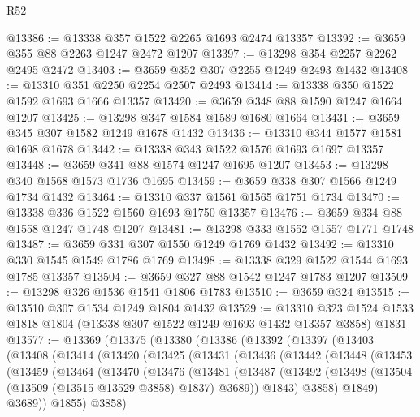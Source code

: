 \begin{lexlean}{R52}
\begin{coremodule}
@13386 := @13338 @357 @1522 @2265 @1693 @2474 @13357
@13392 := @3659 @355 @88 @2263 @1247 @2472 @1207
@13397 := @13298 @354 @2257 @2262 @2495 @2472
@13403 := @3659 @352 @307 @2255 @1249 @2493 @1432
@13408 := @13310 @351 @2250 @2254 @2507 @2493
@13414 := @13338 @350 @1522 @1592 @1693 @1666 @13357
@13420 := @3659 @348 @88 @1590 @1247 @1664 @1207
@13425 := @13298 @347 @1584 @1589 @1680 @1664
@13431 := @3659 @345 @307 @1582 @1249 @1678 @1432
@13436 := @13310 @344 @1577 @1581 @1698 @1678
@13442 := @13338 @343 @1522 @1576 @1693 @1697 @13357
@13448 := @3659 @341 @88 @1574 @1247 @1695 @1207
@13453 := @13298 @340 @1568 @1573 @1736 @1695
@13459 := @3659 @338 @307 @1566 @1249 @1734 @1432
@13464 := @13310 @337 @1561 @1565 @1751 @1734
@13470 := @13338 @336 @1522 @1560 @1693 @1750 @13357
@13476 := @3659 @334 @88 @1558 @1247 @1748 @1207
@13481 := @13298 @333 @1552 @1557 @1771 @1748
@13487 := @3659 @331 @307 @1550 @1249 @1769 @1432
@13492 := @13310 @330 @1545 @1549 @1786 @1769
@13498 := @13338 @329 @1522 @1544 @1693 @1785 @13357
@13504 := @3659 @327 @88 @1542 @1247 @1783 @1207
@13509 := @13298 @326 @1536 @1541 @1806 @1783
@13510 := @3659 @324
@13515 := @13510 @307 @1534 @1249 @1804 @1432
@13529 := @13310
    @323
    @1524
    @1533
    @1818
    @1804
    (@13338 @307 @1522 @1249 @1693 @1432 @13357 @3858)
    @1831
@13577 := @13369
    (@13375
      (@13380
        (@13386
          (@13392
            (@13397
              (@13403
                (@13408
                  (@13414
                    (@13420
                      (@13425
                        (@13431
                          (@13436
                            (@13442
                              (@13448
                                (@13453
                                  (@13459
                                    (@13464
                                      (@13470
                                        (@13476
                                          (@13481
                                            (@13487
                                              (@13492
                                                (@13498
                                                  (@13504
                                                    (@13509 (@13515 @13529 @3858) @1837)
                                                    @3689))
                                                @1843)
                                              @3858)
                                            @1849)
                                          @3689))
                                      @1855)
                                    @3858)

\end{coremodule}
\end{lexlean}
